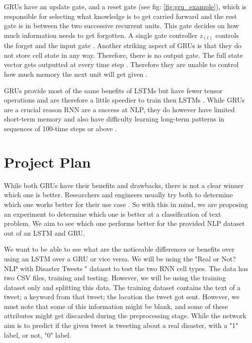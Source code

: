 \documentclass[a4paper,10pt]{article}
\begin{document}
	GRUs have an update gate, and a reset gate (see fig: \ref{fig:gru_example}), which is responsible for selecting what knowledge is to get carried forward and the rest gate is in between the two successive recurrent units. This gate decides on how much information needs to get forgotten. A single gate controller $z_{(t)}$ controls the forget and the input gate \cite{geron2019hands}.  Another striking aspect of GRUs is that they do not store cell state in any way. Therefore, there is no output gate. The full state vector gets outputted at every time step \cite{geron2019hands}. Therefore they are unable to control how much memory the next unit will get given \cite{g4g}.  
	
	GRUs provide most of the same benefits of LSTMs but have fewer tensor operations and are therefore a little speedier to train then LSTMs \cite{illustrated_lstm_gru}. While GRUs are a crucial reason RNN are a success at NLP, they do however have limited short-term memory and also have difficulty learning long-term patterns in sequences of 100-time steps or above \cite{geron2019hands}.


\section{Project Plan}
\label{sec:project_plan}

	While both GRUs have their benefits and drawbacks, there is not a clear winner which one is better. Researchers and engineers usually try both to determine which one works better for their use case \cite{illustrated_lstm_gru}. So with this in mind, we are proposing an experiment to determine which one is better at a classification of text problem. We aim to see which one performs better for the provided NLP dataset out of an LSTM and GRU.
	
	We want to be able to see what are the noticeable differences or benefits over using an LSTM over a GRU or vice versa. We will be using the "Real or Not? NLP with Disaster Tweets \cite{disater_kaggle}" dataset to test the two RNN cell types.  The data has two CSV files, training and testing. However, we will be using the training dataset only and splitting this data.
	The training dataset contains the text of a tweet; a keyword from that tweet; the location the tweet got sent. However, we must note that some of this information might be blank, and some of these attributes might get discarded during the preprocessing stage. While the network aim is to predict if the given tweet is tweeting about a real disaster, with a "1" label, or not, "0" label. 
	
\end{document}
